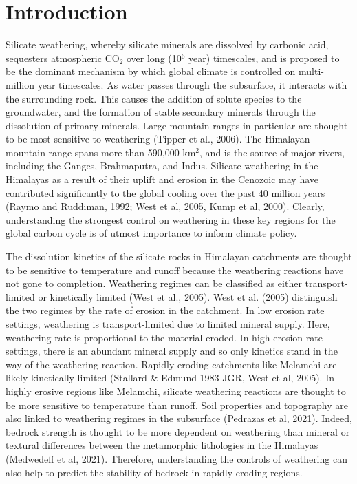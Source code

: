 
\section{Introduction}

Silicate weathering, whereby silicate minerals are dissolved by carbonic acid, sequesters atmospheric CO$_2$ over long (10$^6$ year) timescales, and is proposed to be the dominant mechanism by which global climate is controlled on multi-million year timescales. As water passes through the subsurface, it interacts with the surrounding rock. This causes the addition of solute species to the groundwater, and the formation of stable secondary minerals through the dissolution of primary minerals. Large mountain ranges in particular are thought to be most sensitive to weathering (Tipper et al., 2006). The Himalayan mountain range spans more than 590,000 km$^2$, and is the source of major rivers, including the Ganges, Brahmaputra, and Indus. Silicate weathering in the Himalayas as a result of their uplift and erosion in the Cenozoic may have contributed significantly to the global cooling over the past 40 million years (Raymo and Ruddiman, 1992; West et al, 2005, Kump et al, 2000). Clearly, understanding the strongest control on weathering in these key regions for the global carbon cycle is of utmost importance to inform climate policy.

\bsk

 The dissolution kinetics of the silicate rocks in Himalayan catchments are thought to be sensitive to temperature and runoff because the weathering reactions have not gone to completion.  Weathering regimes can be classified as either transport-limited or kinetically limited (West et al., 2005). West et al. (2005) distinguish the two regimes by the rate of erosion in the catchment. In low erosion rate settings, weathering is transport-limited due to limited mineral supply. Here, weathering rate is proportional to the material eroded. In high erosion rate settings, there is an abundant mineral supply and so only kinetics stand in the way of the weathering reaction. Rapidly eroding catchments like Melamchi are likely kinetically-limited (Stallard \& Edmund 1983 JGR, West et al, 2005). In highly erosive regions like Melamchi, silicate weathering reactions are thought to be more sensitive to temperature than runoff. Soil properties and topography are also linked to weathering regimes in the subsurface (Pedrazas et al, 2021). Indeed, bedrock strength is thought to be more dependent on weathering than mineral or textural differences between the metamorphic lithologies in the Himalayas (Medwedeff et al, 2021). Therefore, understanding the controls of weathering can also help to predict the stability of bedrock in rapidly eroding regions. 

